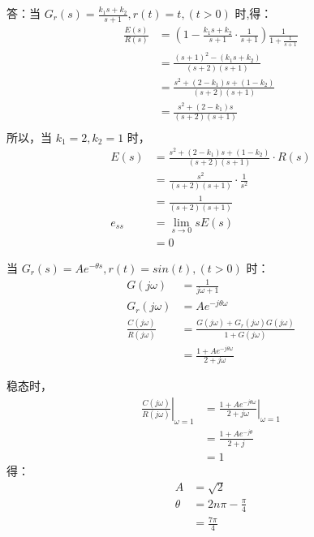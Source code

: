 \onlyanswer
{
	答：当 $G_r(s)=\frac{k_1 s+k_2}{s+1},r(t)=t,(t>0)$ 时,得：
	\begin{align*}
	\frac{E(s)}{R(s)} &= (1-\frac{k_1s+k_2}{s+1}\cdot\frac{1}{s+1})\frac{1}{1+\frac{1}{s+1}} \\
	&=\frac{(s+1)^2-(k_1s+k_2)}{(s+2)(s+1)} \\
	&=\frac{s^2+(2-k_1)s+(1-k_2)}{(s+2)(s+1)} \\
	&=\frac{s^2+(2-k_1)s}{(s+2)(s+1)} \\
	\end{align*}
	所以，当 $k_1=2,k_2=1$ 时，
	\begin{align*}
	E(s) &=\frac{s^2+(2-k_1)s+(1-k_2)}{(s+2)(s+1)}\cdot R(s) \\
	&=\frac{s^2}{(s+2)(s+1)}\cdot \frac{1}{s^2} \\
	&=\frac{1}{(s+2)(s+1)} \\
	e_{ss} &= \lim_{s\rightarrow 0} sE(s) \\
	&= 0
	\end{align*}
	
	当 $G_r(s)=Ae^{-\theta s},r(t)=sin(t),(t>0)$ 时：
	\begin{align*}
	G(j\omega) &=\frac{1}{j\omega+1} \\
	G_r(j\omega) &=Ae^{-j\theta\omega} \\
	\frac{C(j\omega)}{R(j\omega)} &= \frac{G(j\omega)+G_r(j\omega)G(j\omega)}{1+G(j\omega)} \\
	&=\frac{1+Ae^{-j\theta\omega}}{2+j\omega}
	\end{align*}
	
	稳态时，
	\begin{align*}
	\left.\frac{C(j\omega)}{R(j\omega)}\right|_{\omega=1} &=\left.\frac{1+Ae^{-j\theta\omega}}{2+j\omega}\right|_{\omega=1} \\
	&=\frac{1+Ae^{-j\theta}}{2+j} \\
	&=1 
	\end{align*}
	得：
	\begin{align*}
	A &=\sqrt{2} \\
	\theta &=2n\pi-\frac{\pi}{4}\\
	&=\frac{7\pi}{4}
	\end{align*}
}




